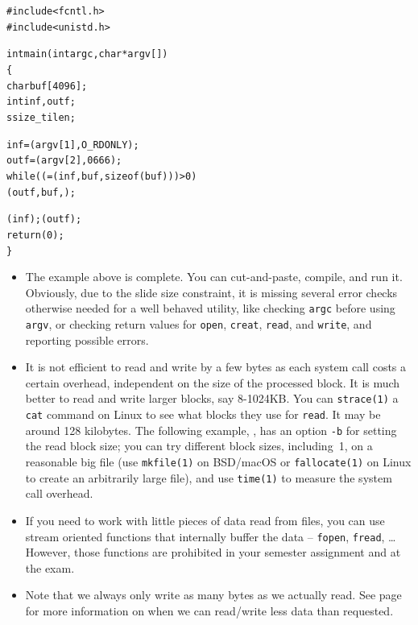
\begin{slide}
\begin{alltt}
{\footnotesize
#include <fcntl.h>
#include <unistd.h>

int main(int argc, char *argv[])
\{
    char buf[4096];
    int inf, outf;
    ssize\_t ilen;

    inf = (argv[1], O\_RDONLY);
    outf = (argv[2], 0666);
    while (( = (inf, buf, sizeof (buf))) > 0)
            (outf, buf, );

    (inf); (outf);
    return (0);
\}
}
\end{alltt}
\end{slide}

\begin{itemize}
\item The example above is complete.  You can cut-and-paste, compile, and run
it.  Obviously, due to the slide size constraint, it is missing several error
checks otherwise needed for a well behaved utility, like checking \texttt{argc}
before using \texttt{argv}, or checking return values for \texttt{open},
\texttt{creat}, \texttt{read}, and \texttt{write}, and reporting possible
errors.
\item It is not efficient to read and write by a few bytes as each system call
costs a certain overhead, independent on the size of the processed block.  It is
much better to read and write larger blocks, say 8-1024KB.  You can
\texttt{strace(1)} a \texttt{cat} command on Linux to see what blocks they use
for \texttt{read}.  It may be around 128 kilobytes.  The following example,
, has an option \texttt{-b} for setting the read block size;
you can try different block sizes, including~1, on a reasonable big file (use
\texttt{mkfile(1)} on BSD/macOS or \texttt{fallocate(1)} on Linux to create an
arbitrarily large file), and use \texttt{time(1)} to measure the system call
overhead.
\item If you need to work with little pieces of data read from files, you can
use stream oriented functions that internally buffer the data -- \texttt{fopen},
\texttt{fread}, \dots  However, those functions are prohibited in your semester
assignment and at the exam.
\item Note that we always only write as many bytes as we actually read.  See
page \pageref{READCALL} for more information on when we can read/write less data
than requested.
\end{itemize}

